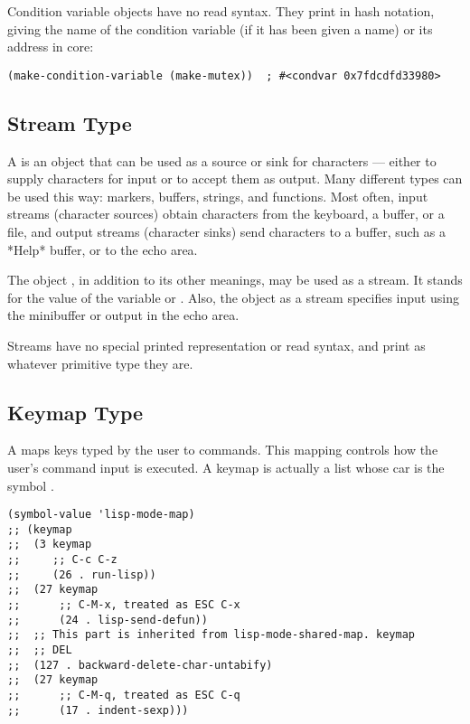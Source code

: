 Condition variable objects have no read syntax.
They print in hash notation, giving the name of the condition variable (if it has been given a name) or its address in core:
\begin{lstlisting}
(make-condition-variable (make-mutex))  ; #<condvar 0x7fdcdfd33980>
\end{lstlisting}

\subsection{Stream Type}
\label{sec:stream-type}

A  is an object that can be used as a source or sink for characters — either to supply characters for input or to accept them as output.
Many different types can be used this way: markers, buffers, strings, and functions.
Most often, input streams (character sources) obtain characters from the keyboard, a buffer, or a file, and output streams (character sinks) send characters to a buffer, such as a *Help* buffer, or to the echo area.

The object , in addition to its other meanings, may be used as a stream.
It stands for the value of the variable  or .
Also, the object  as a stream specifies input using the minibuffer or output in the echo area.

Streams have no special printed representation or read syntax, and print as whatever primitive type they are.

\subsection{Keymap Type}
\label{sec:keymap-type}

A  maps keys typed by the user to commands.
This mapping controls how the user’s command input is executed.
A keymap is actually a list whose car is the symbol .

\begin{lstlisting}
(symbol-value 'lisp-mode-map)
;; (keymap
;;  (3 keymap
;;     ;; C-c C-z
;;     (26 . run-lisp))
;;  (27 keymap
;;      ;; C-M-x, treated as ESC C-x
;;      (24 . lisp-send-defun))
;;  ;; This part is inherited from lisp-mode-shared-map. keymap
;;  ;; DEL
;;  (127 . backward-delete-char-untabify)
;;  (27 keymap
;;      ;; C-M-q, treated as ESC C-q
;;      (17 . indent-sexp)))
\end{lstlisting}



